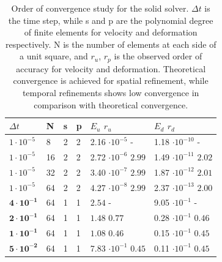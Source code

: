 \begin{table}[h!]
\centering
 \begin{tabular}{|p{1.5cm}|p{0.8cm}|p{0.8cm}|p{0.8cm}|p{3.7cm}|p{3.7cm}|}
   \hline
$\Delta t$ & N & s & p  & $E_u$ \hspace{16mm}  $r_u$ & $E_d$ \hspace{16mm} $r_d$ \\
   \hline
$1 \cdot 10^{-5}$  &8   &2 &2 & 2.16 $\cdot 10^{-5}$ \hspace{9mm} -& 1.18 $\cdot 10^{-10}$ \hspace{8mm}- \\
\hline
$1 \cdot 10^{-5}$  & 16&2 &2 & 2.72 $\cdot 10^{-6}$ \hspace{5mm} $\mathbf{2.99}$ & 1.49 $\cdot 10^{-11}$ \hspace{3mm} $\mathbf{2.02}$ \\
\hline
$1 \cdot 10^{-5}$  & 32&2 &2 & 3.40 $\cdot 10^{-7}$ \hspace{5mm} $\mathbf{2.99}$ & 1.87 $\cdot 10^{-12}$ \hspace{3mm} $\mathbf{2.01}$ \\
\hline
$1 \cdot 10^{-5}$  & 64&2 &2 & 4.27 $\cdot 10^{-8}$ \hspace{5mm} $\mathbf{2.99}$ & 2.37 $\cdot 10^{-13}$ \hspace{3mm} $\mathbf{2.00}$ \\
\hline \hline
$\mathbf{4 \cdot 10^{-1}}$  & 64   &1 & 1 &  $2.54$ \hspace{20mm} -& 9.05  $\cdot 10^{-1}$ \hspace{10mm}- \\
\hline
$\mathbf{2 \cdot 10^{-1}}$  & 64&1 &1 &  $1.48$ \hspace{16mm} $\mathbf{0.77}$ &  0.28  $\cdot 10^{-1}$ \hspace{5mm} $\mathbf{0.46}$ \\
\hline
$\mathbf{1 \cdot 10^{-1}}$ & 64&1 &1 &  $1.08$ \hspace{16mm} $\mathbf{0.46}$ &  0.15  $\cdot 10^{-1}$ \hspace{5mm} $\mathbf{0.45}$ \\
\hline
$\mathbf{5 \cdot 10^{-2}}$ & 64&1 &1 & 7.83 $\cdot 10^{-1}$ \hspace{5mm} $\mathbf{0.45}$ &  0.11 $\cdot 10^{-1}$ \hspace{5mm} $\mathbf{0.45}$ \\
\end{tabular}
\caption{Order of convergence study for the solid solver. $\Delta t$ is the time step, while s and p are the polynomial degree of finite elements for velocity and deformation respectively. N is the number of elements at each side of a unit square, and $r_u$, $r_p$ is the observed order of accuracy for velocity and deformation. Theoretical convergence is achieved for spatial refinement, while temporal refinements shows low convergence in comparison with theoretical convergence.}
\label{table:conv2}
\end{table}
\newpage
